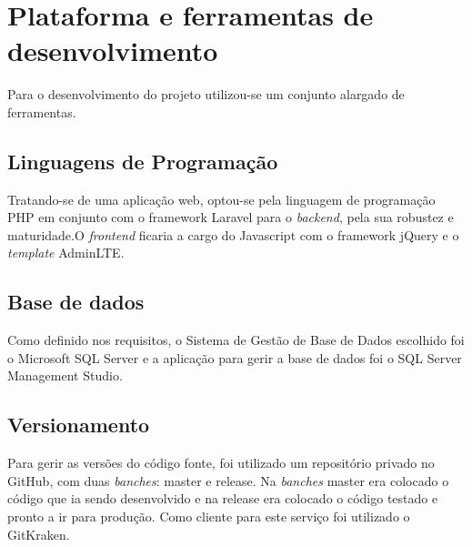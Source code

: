 \section{Plataforma e ferramentas de desenvolvimento}
Para o desenvolvimento do projeto utilizou-se um conjunto alargado de ferramentas.
\subsection{Linguagens de Programação}
Tratando-se de uma aplicação web, optou-se pela linguagem de programação PHP em conjunto com o framework Laravel para o \textit{backend}\label{sym:BACKEND}, pela sua robustez e  maturidade\cite{Mansuri2018}.O \textit{frontend}\label{sym:FRONTEND} ficaria a cargo do Javascript com o framework jQuery e o \textit{template} AdminLTE.

\subsection{Base de dados}
Como definido nos requisitos, o Sistema de Gestão de Base de Dados escolhido foi o Microsoft SQL Server e a aplicação para gerir a base de dados foi o SQL Server Management Studio.

\subsection{Versionamento}
Para gerir as versões do código fonte, foi utilizado um repositório privado no GitHub, com duas \textit{banches}\label{sym:BRANCH}: master e release.
Na \textit{banches} master era colocado o código que ia sendo desenvolvido e na release era colocado o código testado e pronto a ir para produção.
Como cliente para este serviço foi utilizado o GitKraken.